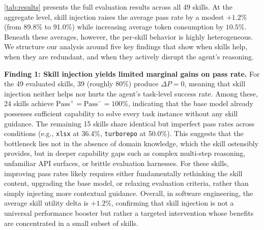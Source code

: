 \documentclass{article}
\begin{document}
\autoref{tab:results} presents the full evaluation results across all 49 skills.
At the aggregate level, skill injection raises the average pass rate by a modest $+1.2\%$ (from 89.8\% to 91.0\%) while increasing average token consumption by $10.5\%$.
Beneath these averages, however, the per-skill behavior is highly heterogeneous.
We structure our analysis around five key findings that show when skills help, when they are redundant, and when they actively disrupt the agent’s reasoning.

\textbf{Finding 1: Skill injection yields limited marginal gains on pass rate.}
For the 49 evaluated skills, 39 (roughly 80\%) produce $\Delta P = 0$, meaning that skill injection neither helps nor hurts the agent's task-level success rate.
Among these, 24 skills achieve $\text{Pass}^{+} = \text{Pass}^{-} = 100\%$, indicating that the base model already possesses sufficient capability to solve every task instance without any skill guidance.
The remaining 15 skills share identical but imperfect pass rates across conditions (e.g., \texttt{xlsx} at 36.4\%, \texttt{turborepo} at 50.0\%).
This suggests that the bottleneck lies not in the absence of domain knowledge, which the skill ostensibly provides, but in deeper capability gaps such as complex multi-step reasoning, unfamiliar API surfaces, or brittle evaluation harnesses.
For these skills, improving pass rates likely requires either fundamentally rethinking the skill content, upgrading the base model, or relaxing evaluation criteria, rather than simply injecting more contextual guidance.
Overall, in software engineering, the average skill utility delta is $+1.2\%$, confirming that skill injection is not a universal performance booster but rather a targeted intervention whose benefits are concentrated in a small subset of skills.
\end{document}
